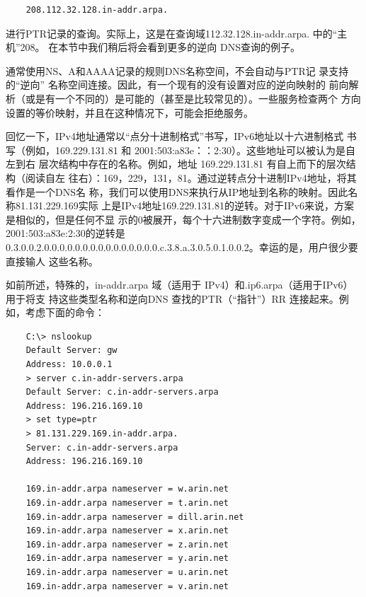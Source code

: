 
\begin{verbatim}
    208.112.32.128.in-addr.arpa.
\end{verbatim}

进行PTR记录的查询。实际上，这是在查询域112.32.128.in-addr.arpa. 中的“主机”208。
在本节中我们稍后将会看到更多的逆向 DNS查询的例子。

\begin{tcolorbox}
    通常使用NS、A和AAAA记录的规则DNS名称空间，不会自动与PTR记
    录支持的“逆向” 名称空间连接。因此，有一个现有的没有设置对应的逆向映射的
    前向解析（或是有一个不同的）是可能的（甚至是比较常见的）。一些服务检查两个
    方向设置的等价映射，并且在这种情况下，可能会拒绝服务。
\end{tcolorbox}

回忆一下，IPv4地址通常以“点分十进制格式”书写，IPv6地址以十六进制格式
书写（例如，169.229.131.81 和 2001:503:a83e：：2:30）。这些地址可以被认为是自左到右
层次结构中存在的名称。例如，地址 169.229.131.81 有自上而下的层次结构（阅读自左
往右）：169，229，131，81。通过逆转点分十进制IPv4地址，将其看作是一个DNS名
称，我们可以使用DNS来执行从IP地址到名称的映射。因此名称81.131.229.169实际
上是IPv4地址169.229.131.81的逆转。对于IPv6来说，方案是相似的，但是任何不显
示的0被展开，每个十六进制数字变成一个字符。例如，2001:503:a83e:2:30的逆转是
0.3.0.0.2.0.0.0.0.0.0.0.0.0.0.0.0.0.0.0.c.3.8.a.3.0.5.0.1.0.0.2。幸运的是，用户很少要直接输人
这些名称。

如前所述，特殊的，in-addr.arpa 域（适用于 IPv4）和.ip6.arpa（适用于IPv6）用于将支
持这些类型名称和逆向DNS 查找的PTR（“指针”）RR 连接起来。例如，考虑下面的命令：

\begin{verbatim}
    C:\> nslookup
    Default Server: gw
    Address: 10.0.0.1
    > server c.in-addr-servers.arpa
    Default Server: c.in-addr-servers.arpa
    Address: 196.216.169.10
    > set type=ptr
    > 81.131.229.169.in-addr.arpa.
    Server: c.in-addr-servers.arpa
    Address: 196.216.169.10

    169.in-addr.arpa nameserver = w.arin.net
    169.in-addr.arpa nameserver = t.arin.net
    169.in-addr.arpa nameserver = dill.arin.net
    169.in-addr.arpa nameserver = x.arin.net
    169.in-addr.arpa nameserver = z.arin.net
    169.in-addr.arpa nameserver = y.arin.net
    169.in-addr.arpa nameserver = u.arin.net
    169.in-addr.arpa nameserver = v.arin.net
\end{verbatim}


